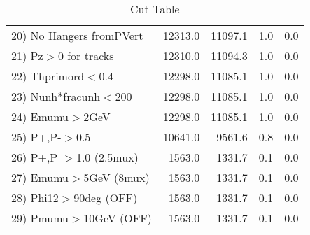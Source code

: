 \begin{table}[h!]
\begin{tabular}{||l||r|r|r|r||}
 20) No Hangers fromPVert &     12313.0 &     11097.1 &         1.0 &         0.0 \\
 21) Pz$>$0 for tracks    &     12310.0 &     11094.3 &         1.0 &         0.0 \\
 22) Thprimord$<$0.4      &     12298.0 &     11085.1 &         1.0 &         0.0 \\
 23) Nunh*fracunh$<$200   &     12298.0 &     11085.1 &         1.0 &         0.0 \\
 24) Emumu$>$2GeV         &     12298.0 &     11085.1 &         1.0 &         0.0 \\
 25) P+,P-$>$0.5          &     10641.0 &      9561.6 &         0.8 &         0.0 \\
 26) P+,P-$>$1.0 (2.5mux) &      1563.0 &      1331.7 &         0.1 &         0.0 \\
 27) Emumu$>$5GeV  (8mux) &      1563.0 &      1331.7 &         0.1 &         0.0 \\
 28) Phi12$>$90deg  (OFF) &      1563.0 &      1331.7 &         0.1 &         0.0 \\
 29) Pmumu$>$10GeV  (OFF) &      1563.0 &      1331.7 &         0.1 &         0.0 \\
 \hline
 \hline
 \end{tabular}
 \caption{Cut Table \cohjp  }
 \label{tab-cut__jpsi}
 \end{table}
